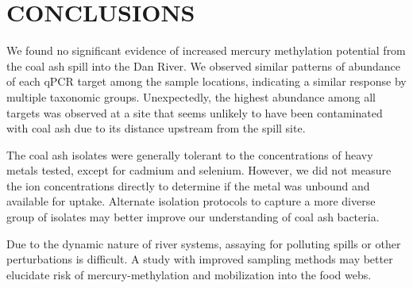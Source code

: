 \documentclass[ms, hidelinks]{uncgdissertationexp3}
\theoremstyle{plain}
\theoremstyle{definition}
\theoremstyle{remark}
\begin{document}
\chapter{CONCLUSIONS}\label{conclusions}

We found no significant evidence of increased mercury methylation potential from the coal ash spill into the Dan River. We observed similar patterns of abundance of each qPCR target among the sample locations, indicating a similar response by multiple taxonomic groups. Unexpectedly, the highest abundance among all targets was observed at a site that seems unlikely to have been contaminated with coal ash due to its distance upstream from the spill site.

The coal ash isolates were generally tolerant to the concentrations of heavy metals tested, except for cadmium and selenium. However, we did not measure the ion concentrations directly to determine if the metal was unbound and available for uptake. Alternate isolation protocols to capture a more diverse group of isolates may better improve our understanding of coal ash bacteria. 

Due to the dynamic nature of river systems, assaying for polluting spills or other perturbations is difficult. A study with  improved sampling methods may better elucidate risk of mercury-methylation and mobilization into the food webs. 

\nocite{*}



%

%
\appendix
\end{document}

